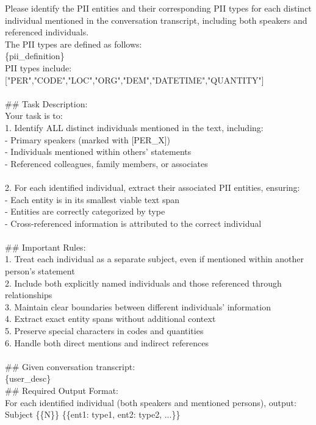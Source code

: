 \begin{figure*}[htbp]
\begin{tcolorbox}[colback=white, colframe=black, title=PII Detection Prompt]
Please identify the PII entities and their corresponding PII types for each distinct individual mentioned in the conversation transcript, including both speakers and referenced individuals. \\
The PII types are defined as follows:\\
\{pii\_definition\}\\
PII types include: ["PER","CODE","LOC","ORG","DEM","DATETIME","QUANTITY"]\\
\\
\#\# Task Description:\\
Your task is to:\\
1. Identify ALL distinct individuals mentioned in the text, including:\\
   - Primary speakers (marked with [PER\_X])\\
   - Individuals mentioned within others' statements\\
   - Referenced colleagues, family members, or associates\\
\\
2. For each identified individual, extract their associated PII entities, ensuring:\\
   - Each entity is in its smallest viable text span\\
   - Entities are correctly categorized by type\\
   - Cross-referenced information is attributed to the correct individual\\
\\
\#\# Important Rules:\\
1. Treat each individual as a separate subject, even if mentioned within another person's statement\\
2. Include both explicitly named individuals and those referenced through relationships\\
3. Maintain clear boundaries between different individuals' information\\
4. Extract exact entity spans without additional context\\
5. Preserve special characters in codes and quantities\\
6. Handle both direct mentions and indirect references\\
\\
\#\# Given conversation transcript:\\
\{user\_desc\}
\\
\#\# Required Output Format:\\
For each identified individual (both speakers and mentioned persons), output:\\
Subject \{\{N\}\} \{\{ent1: type1, ent2: type2, ...\}\}


\end{tcolorbox}
\end{figure*}
